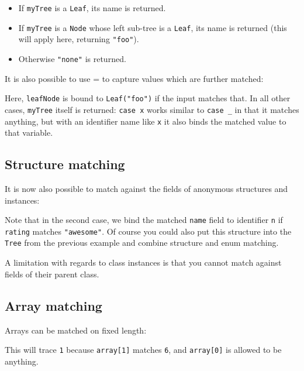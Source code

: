 \documentclass[a4paper,oneside]{book}
\newcommand{\type}[1]{\texttt{#1}}
\newcommand{\expr}[1]{\texttt{#1}}
\newcommand{\haxe}[2][]{%
}
\begin{document}
\begin{itemize}
	\item If \expr{myTree} is a \expr{Leaf}, its name is returned.
	\item If \expr{myTree} is a \expr{Node} whose left sub-tree is a \expr{Leaf}, its name is returned (this will apply here, returning \expr{"foo"}).
	\item Otherwise \expr{"none"} is returned.
\end{itemize}

It is also possible to use = to capture values which are further matched:

\haxe[firstline=30,lastline=34]{assets/PatternMatching.hx}

Here, \expr{leafNode} is bound to \expr{Leaf("foo")} if the input matches that. In all other cases, \expr{myTree} itself is returned: \expr{case x} works similar to \expr{case _} in that it matches anything, but with an identifier name like \expr{x} it also binds the matched value to that variable.

\subsection{Structure matching}
\label{lf-pattern-matching-structure}

It is now also possible to match against the fields of anonymous structures and instances:

\haxe[firstline=36,lastline=42]{assets/PatternMatching.hx}

Note that in the second case, we bind the matched \expr{name} field to identifier \expr{n} if \expr{rating} matches \expr{"awesome"}. Of course you could also put this structure into the \type{Tree} from the previous example and combine structure and enum matching.

A limitation with regards to class instances is that you cannot match against fields of their parent class.

\subsection{Array matching}
\label{lf-pattern-matching-array}

Arrays can be matched on fixed length:

\haxe[firstline=45,lastline=53]{assets/PatternMatching.hx}

This will trace \expr{1} because \expr{array[1]} matches \expr{6}, and \expr{array[0]} is allowed to be anything.
\end{document}
